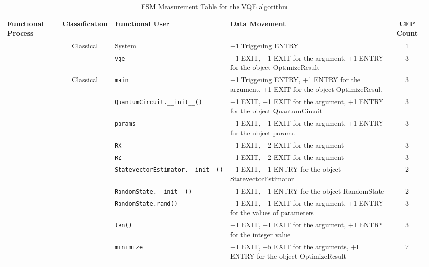 \begin{table}[h]
\caption{FSM Measurement Table for the VQE algorithm}
\label{tab:fsm_vqe}
\scriptsize
\begin{tabularx}{\linewidth}{|>{\raggedright\arraybackslash}p{4.5cm}|
                                >{\raggedright\arraybackslash}c|
                                >{\raggedright\arraybackslash}p{4.5cm}|
                                >{\raggedright\arraybackslash}X|
                                c|}
\hline
\textbf{Functional Process} & \textbf{Classification} & \textbf{Functional User} & \textbf{Data Movement} & \textbf{CFP Count} \\ \hline

\multirow{\texttt{main}}
& Classical & System & +1 Triggering ENTRY & 1 \\ \cline{3-5}
& & \texttt{vqe} & +1 EXIT, +1 EXIT for the argument, +1 ENTRY for the object OptimizeResult & 3 \\ \hline

\multirow{\texttt{vqe}}
& Classical & \texttt{main} & +1 Triggering ENTRY, +1 ENTRY for the argument, +1 EXIT for the object OptimizeResult & 3 \\ \cline{3-5} 
& & \texttt{QuantumCircuit.\_\_init\_\_()} & +1 EXIT, +1 EXIT for the argument, +1 ENTRY for the object QuantumCircuit & 3 \\ \cline{3-5} 
& & \texttt{params} & +1 EXIT, +1 EXIT for the argument, +1 ENTRY for the object params & 3 \\ \cline{3-5} 
& & \texttt{RX} & +1 EXIT, +2 EXIT for the argument & 3 \\ \cline{3-5} 
& & \texttt{RZ} & +1 EXIT, +2 EXIT for the argument & 3 \\ \cline{3-5} 
& & \texttt{StatevectorEstimator.\_\_init\_\_()} & +1 EXIT, +1 ENTRY for the object StatevectorEstimator & 2 \\ \cline{3-5} 
& & \texttt{RandomState.\_\_init\_\_()} & +1 EXIT, +1 ENTRY for the object RandomState & 2 \\ \cline{3-5} 
& & \texttt{RandomState.rand()} & +1 EXIT, +1 EXIT for the argument, +1 ENTRY for the values of parameters & 3 \\ \cline{3-5} 
& & \texttt{len()} & +1 EXIT, +1 EXIT for the argument, +1 ENTRY for the integer value & 3 \\ \cline{3-5} 
& & \texttt{minimize} & +1 EXIT, +5 EXIT for the arguments, +1 ENTRY for the object OptimizeResult & 7 \\ \hline


\end{tabularx}
\end{table}
